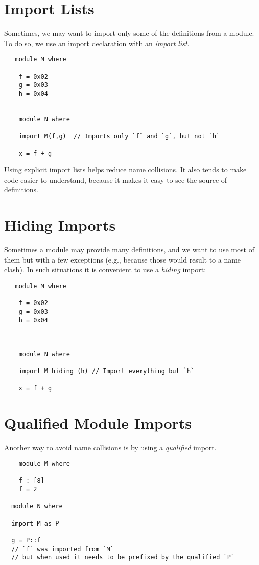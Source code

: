 \section{Import Lists}

Sometimes, we may want to import only some of the definitions
from a module.  To do so, we use an import declaration with
an \textit{import list}.


\begin{verbatim}
   module M where

    f = 0x02
    g = 0x03
    h = 0x04


    module N where

    import M(f,g)  // Imports only `f` and `g`, but not `h`

    x = f + g
\end{verbatim}

Using explicit import lists helps reduce name collisions.
It also tends to make code easier to understand,  because
it makes it easy to see the source of definitions.


\section{Hiding Imports}

Sometimes a module may provide many definitions, and we want to use
most of them but with a few exceptions (e.g., because those would
result to a name clash).   In such situations it is convenient
to use a \textit{hiding} import:


\begin{verbatim}
   module M where

    f = 0x02
    g = 0x03
    h = 0x04



    module N where

    import M hiding (h) // Import everything but `h`

    x = f + g
\end{verbatim}



\section{Qualified Module Imports}

Another way to avoid name collisions is by using a
\textit{qualified} import.

\begin{verbatim}
    module M where

    f : [8]
    f = 2

  module N where

  import M as P

  g = P::f
  // `f` was imported from `M`
  // but when used it needs to be prefixed by the qualified `P`
\end{verbatim}

